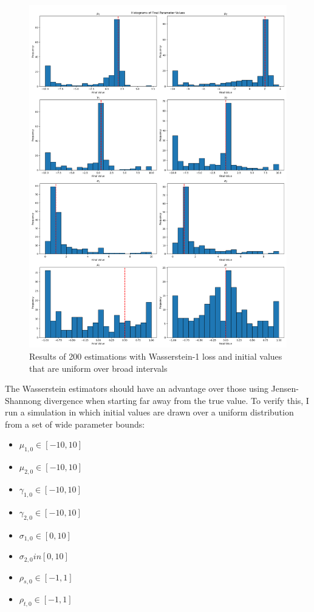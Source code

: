 \begin{figure}
    \includegraphics[width=\textwidth]{./Images/wide_uniform_histograms.png}
    \caption{Results of 200 estimations with Wasserstein-1 loss and initial values that are uniform over broad intervals}
    \label{fig:w1_wide_uniform_histograms}
\end{figure}

The Wasserstein estimators should have an advantage over those using Jensen-Shannong divergence when starting far away from the true value.
To verify this, I run a simulation in which initial values are drawn over a uniform distribution from a set of wide parameter bounds:
\begin{itemize}
    \item $\mu_{1,0} \in [-10, 10]$
    \item $\mu_{2,0} \in [-10, 10]$
    \item $\gamma_{1,0} \in [-10, 10]$
    \item $\gamma_{2,0} \in [-10, 10]$
    \item $\sigma_{1,0} \in [0, 10]$
    \item $\sigma_{2,0} in [0, 10]$
    \item $\rho_{s,0} \in [-1, 1]$
    \item $\rho_{t,0} \in [-1, 1]$
\end{itemize}


